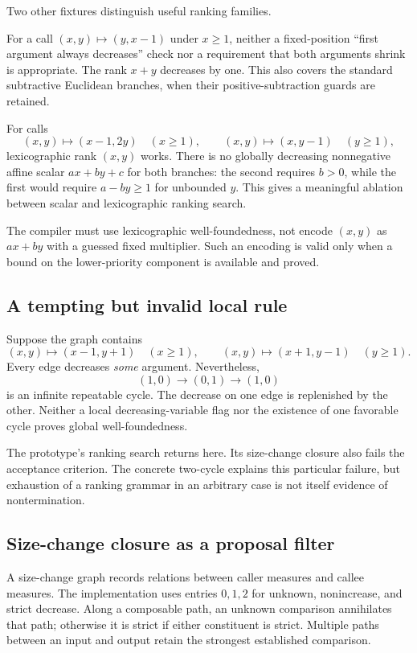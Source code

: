 Two other fixtures distinguish useful ranking families.

For a call $(x,y)\mapsto(y,x-1)$ under $x\ge1$, neither a fixed-position
``first argument always decreases'' check nor a requirement that both arguments
shrink is appropriate. The rank $x+y$ decreases by one. This also covers the
standard subtractive Euclidean branches, when their positive-subtraction guards
are retained.

For calls
\[
 (x,y)\mapsto(x-1,2y)\quad(x\ge1),\qquad
 (x,y)\mapsto(x,y-1)\quad(y\ge1),
\]
lexicographic rank $(x,y)$ works. There is no globally decreasing nonnegative
affine scalar $a x+b y+c$ for both branches: the second requires $b>0$, while
the first would require $a-b y\ge1$ for unbounded $y$. This gives a meaningful
ablation between scalar and lexicographic ranking search.

The compiler must use lexicographic well-foundedness, not encode $(x,y)$ as
$a x+b y$ with a guessed fixed multiplier. Such an encoding is valid only when a
bound on the lower-priority component is available and proved.

\subsection{A tempting but invalid local rule}

Suppose the graph contains
\[
 (x,y)\mapsto(x-1,y+1)\quad(x\ge1),\qquad
 (x,y)\mapsto(x+1,y-1)\quad(y\ge1).
\]
Every edge decreases \emph{some} argument. Nevertheless,
\[
 (1,0)\longrightarrow(0,1)\longrightarrow(1,0)
\]
is an infinite repeatable cycle. The decrease on one edge is replenished by the
other. Neither a local decreasing-variable flag nor the existence of one
favorable cycle proves global well-foundedness.

The prototype's ranking search returns  here. Its size-change
closure also fails the acceptance criterion. The concrete two-cycle explains
this particular failure, but exhaustion of a ranking grammar in an arbitrary
case is not itself evidence of nontermination.

\subsection{Size-change closure as a proposal filter}

A size-change graph records relations between caller measures and callee measures.
The implementation uses entries $0,1,2$ for unknown, nonincrease, and strict
decrease. Along a composable path, an unknown comparison annihilates that path;
otherwise it is strict if either constituent is strict. Multiple paths between
an input and output retain the strongest established comparison.

